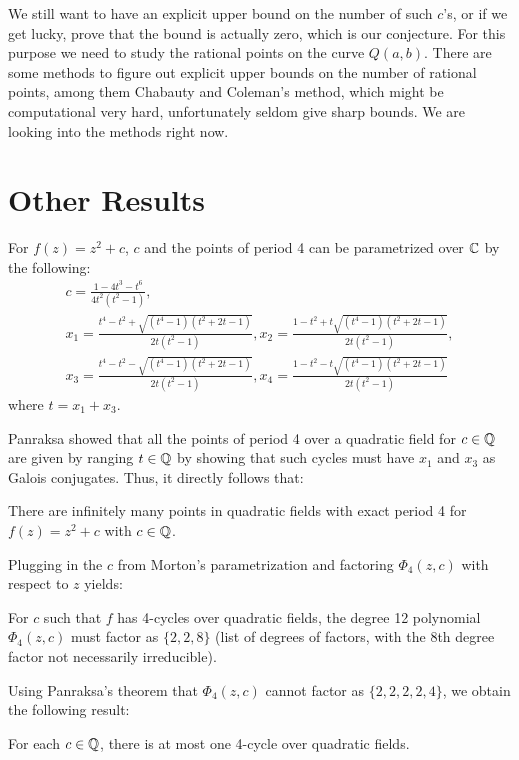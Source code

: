 We still want to have an explicit upper bound on the number of such
$c$'s, or if we get lucky, prove that the bound is actually zero,
which is our conjecture. For this purpose we need to study the
rational points on the curve $Q(a, b)$. There are some methods to
figure out explicit upper bounds on the number of rational points,
among them Chabauty and Coleman's method, which might be computational
very hard, unfortunately seldom give sharp bounds. We are looking into
the methods right now.

\section{Other Results}

\begin{theorem} [Erkama 2006]
For $f(z) = z^2 + c$, $c$ and the points of period 4 can be parametrized
over $\mathbb{C}$ by the following:
\[
\begin{gathered}
	c = \frac{1-4t^3-t^6}{4t^2(t^2-1)}, \\
	x_1 = \frac{t^4 - t^2 + \sqrt{(t^4-1)(t^2+2t-1)}}{2t(t^2-1)}, x_2 = \frac{1 - t^2 + t\sqrt{(t^4-1)(t^2+2t-1)}}{2t(t^2-1)}, \\
	x_3 = \frac{t^4 - t^2 - \sqrt{(t^4-1)(t^2+2t-1)}}{2t(t^2-1)}, x_4 = \frac{1 - t^2 - t\sqrt{(t^4-1)(t^2+2t-1)}}{2t(t^2-1)}
\end{gathered}
\]
where $t = x_1 + x_3$.
\end{theorem}

Panraksa showed that all the points of period 4 over a quadratic field
for $c \in \mathbb{Q}$ are given by ranging $t \in \mathbb{Q}$ by showing that such
cycles must have $x_1$ and $x_3$ as Galois conjugates.
Thus, it directly follows that:
\begin{theorem}
There are infinitely many points in quadratic fields with exact period 4 for
$f(z) = z^2 + c$ with $c \in \mathbb{Q}$.
\end{theorem}

Plugging in the $c$ from Morton's parametrization and factoring $\Phi_4(z,c)$
with respect to $z$ yields:
\begin{lemma}
For $c$ such that $f$ has 4-cycles over quadratic fields, the degree 12
polynomial $\Phi_4(z,c)$ must factor as $\{2,2,8\}$ (list of degrees of
factors, with the 8th degree factor not necessarily irreducible).
\end{lemma}

Using Panraksa's theorem that $\Phi_4(z,c)$ cannot factor as $\{2,2,2,2,4\}$,
we obtain the following result:
\begin{theorem}
For each $c \in \mathbb{Q}$, there is at most one 4-cycle over quadratic fields.
\end{theorem}


